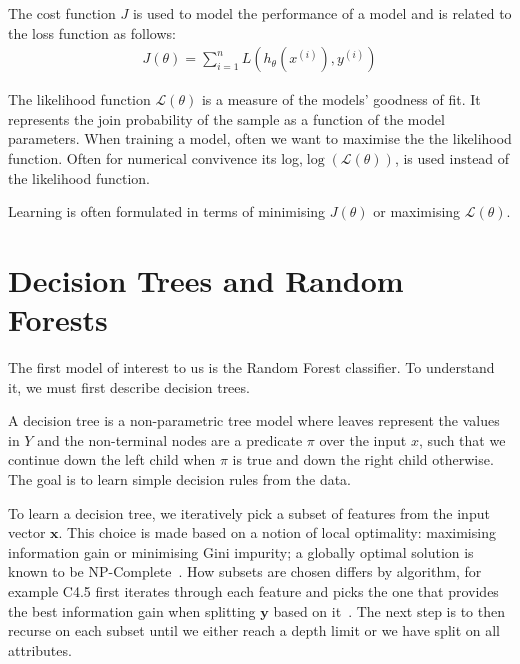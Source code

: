 \begin{definition}
    The cost function $J$ is used to model the performance of a model and is
    related to the loss function as follows:
    \begin{align}
        J(\theta) = \sum_{i=1}^{n}L(h_{\theta}(x^{(i)}), y^{(i)})
    \end{align}
\end{definition}

\begin{definition}
    The likelihood function $\mathcal{L}(\theta)$ is a measure of the models'
    goodness of fit. It represents the join probability of the sample as a
    function of the model parameters. When training a model, often we want to
    maximise the the likelihood function. Often for numerical convivence its
    log,\ie $\log(\mathcal{L}(\theta))$, is used instead of the likelihood
    function.
\end{definition}

\noindent Learning is often formulated in terms of minimising $J(\theta)$ or
maximising $\mathcal{L}(\theta)$.

\section{Decision Trees and Random Forests}
\label{appendix:supervised:randomforests}

The first model of interest to us is the Random Forest classifier. To understand it, we must first describe decision trees.

\begin{definition}
    A decision tree is a non-parametric tree model where leaves represent the
    values in $Y$ and the non-terminal nodes are a predicate $\pi$ over the
    input $x$, such that we continue down the left child when $\pi$ is true and
    down the right child otherwise. The goal is to learn simple decision rules
    from the data.
\end{definition}

To learn a decision tree, we iteratively pick a subset of features from the
input vector $\mathbf{x}$. This choice is made based on a notion of local
optimality: maximising information gain or minimising Gini impurity; a globally
optimal solution is known to be NP-Complete~\cite{laurent1976constructing}. How
subsets are chosen differs by algorithm, for example C4.5 first iterates through
each feature and picks the one that provides the best information gain when
splitting $\mathbf{y}$ based on it~\cite{quinlan2014c4}. The next step is to
then recurse on each subset until we either reach a depth limit or we have split
on all attributes.

